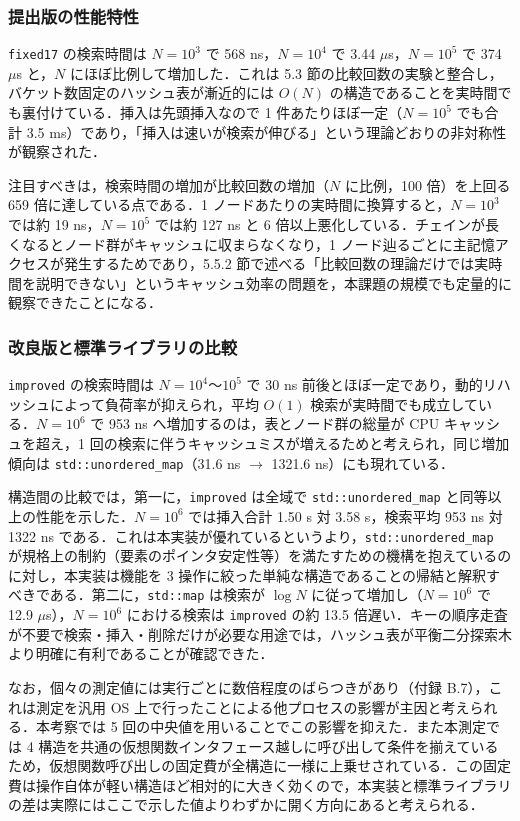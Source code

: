 \subsubsection{提出版の性能特性}

{\tt fixed17} の検索時間は $N=10^3$ で 568 ns，$N=10^4$ で 3.44 $\mu$s，$N=10^5$ で 374 $\mu$s と，$N$ にほぼ比例して増加した．これは 5.3 節の比較回数の実験と整合し，バケット数固定のハッシュ表が漸近的には $O(N)$ の構造であることを実時間でも裏付けている．挿入は先頭挿入なので 1 件あたりほぼ一定（$N=10^5$ でも合計 3.5 ms）であり，「挿入は速いが検索が伸びる」という理論どおりの非対称性が観察された．

注目すべきは，検索時間の増加が比較回数の増加（$N$ に比例，100 倍）を上回る 659 倍に達している点である．1 ノードあたりの実時間に換算すると，$N=10^3$ では約 19 ns，$N=10^5$ では約 127 ns と 6 倍以上悪化している．チェインが長くなるとノード群がキャッシュに収まらなくなり，1 ノード辿るごとに主記憶アクセスが発生するためであり，5.5.2 節で述べる「比較回数の理論だけでは実時間を説明できない」というキャッシュ効率の問題を，本課題の規模でも定量的に観察できたことになる．

\subsubsection{改良版と標準ライブラリの比較}

{\tt improved} の検索時間は $N=10^4$〜$10^5$ で 30 ns 前後とほぼ一定であり，動的リハッシュによって負荷率が抑えられ，平均 $O(1)$ 検索が実時間でも成立している．$N=10^6$ で 953 ns へ増加するのは，表とノード群の総量が CPU キャッシュを超え，1 回の検索に伴うキャッシュミスが増えるためと考えられ，同じ増加傾向は {\tt std::unordered\_map}（31.6 ns $\rightarrow$ 1321.6 ns）にも現れている．

構造間の比較では，第一に，{\tt improved} は全域で {\tt std::unordered\_map} と同等以上の性能を示した．$N=10^6$ では挿入合計 1.50 s 対 3.58 s，検索平均 953 ns 対 1322 ns である．これは本実装が優れているというより，{\tt std::unordered\_map} が規格上の制約（要素のポインタ安定性等）を満たすための機構を抱えている\cite{munoz2022std}のに対し，本実装は機能を 3 操作に絞った単純な構造であることの帰結と解釈すべきである．第二に，{\tt std::map} は検索が $\log N$ に従って増加し（$N=10^6$ で 12.9 $\mu$s），$N=10^6$ における検索は {\tt improved} の約 13.5 倍遅い．キーの順序走査が不要で検索・挿入・削除だけが必要な用途では，ハッシュ表が平衡二分探索木より明確に有利であることが確認できた．

なお，個々の測定値には実行ごとに数倍程度のばらつきがあり（付録 B.7），これは測定を汎用 OS 上で行ったことによる他プロセスの影響が主因と考えられる．本考察では 5 回の中央値を用いることでこの影響を抑えた．また本測定では 4 構造を共通の仮想関数インタフェース越しに呼び出して条件を揃えているため，仮想関数呼び出しの固定費が全構造に一様に上乗せされている．この固定費は操作自体が軽い構造ほど相対的に大きく効くので，本実装と標準ライブラリの差は実際にはここで示した値よりわずかに開く方向にあると考えられる．


